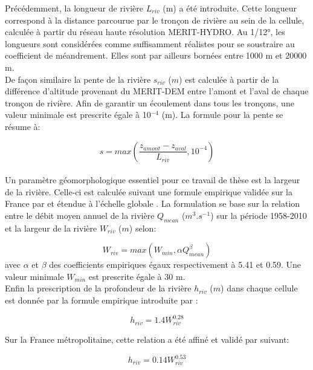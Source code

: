 \noindent Précédemment, la longueur de rivière $L_{riv}$ (m) a été introduite. Cette longueur correspond à la distance parcourue par le tronçon de rivière au sein de la cellule, calculée à partir du réseau haute résolution MERIT-HYDRO. Au 1/12°, les longueurs sont considérées comme suffisamment réalistes pour se soustraire au coefficient de méandrement. Elles sont par ailleurs bornées entre 1000 m et 20000 m.\\

\noindent De façon similaire la pente de la rivière $s_{riv}$ ($m$) est calculée à partir de la différence d'altitude provenant du MERIT-DEM entre l'amont et l'aval de chaque tronçon de rivière. Afin de garantir un écoulement dans tous les tronçons, une valeur minimale est prescrite égale à 10$^{-4}$ (m). La formule pour la pente se résume à:

\begin{equation}
s = max\left(\frac{z_{amont} - z_{aval}}{L_{riv}},10^{-4}\right)
\end{equation}
~\\

Un paramètre géomorphologique essentiel pour ce travail de thèse est la largeur de la rivière. Celle-ci est calculée suivant une formule empirique validée sur la France par \citet{vergnes2014} et étendue à l'échelle globale \citep{decharme2019}. La formulation se base sur la relation entre le débit moyen annuel de la rivière $Q_{mean}$ ($m^{3}.s^{-1}$) sur la période 1958-2010 et la largeur de la rivière $W_{riv}$ ($m$) selon:

\begin{equation}
W_{riv} = max(W_{min}, \alpha Q_{mean}^{\beta})
\end{equation}
avec $\alpha$ et $\beta$ des coefficients empiriques égaux respectivement à 5.41 et 0.59. Une valeur minimale $W_{min}$ est prescrite égale à 30 m.\\

Enfin la prescription de la profondeur de la rivière $h_{riv}$ ($m$) dans chaque cellule est donnée par la formule empirique introduite par \citet{vergnes2014}:

\begin{equation}
h_{riv} = 1.4 W_{riv}^{0.28}
\end{equation}

Sur la France métropolitaine, cette relation a été affiné et validé par \citep{vergnes2018} suivant:

\begin{equation}
h_{riv} = 0.14 W_{riv}^{0.53}
\end{equation}

